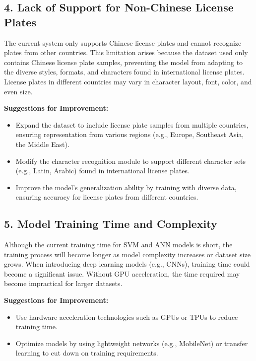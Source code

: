 \documentclass{article}
\begin{document}
	\subsection*{4. Lack of Support for Non-Chinese License Plates}
	
	The current system only supports Chinese license plates and cannot recognize plates from other countries. This limitation arises because the dataset used only contains Chinese license plate samples, preventing the model from adapting to the diverse styles, formats, and characters found in international license plates. License plates in different countries may vary in character layout, font, color, and even size.
	
	\textbf{Suggestions for Improvement:}
	\begin{itemize}
		\item Expand the dataset to include license plate samples from multiple countries, ensuring representation from various regions (e.g., Europe, Southeast Asia, the Middle East).
		\item Modify the character recognition module to support different character sets (e.g., Latin, Arabic) found in international license plates.
		\item Improve the model's generalization ability by training with diverse data, ensuring accuracy for license plates from different countries.
	\end{itemize}
	
	\subsection*{5. Model Training Time and Complexity}
	
	Although the current training time for SVM and ANN models is short, the training process will become longer as model complexity increases or dataset size grows. When introducing deep learning models (e.g., CNNs), training time could become a significant issue. Without GPU acceleration, the time required may become impractical for larger datasets.
	
	\textbf{Suggestions for Improvement:}
	\begin{itemize}
		\item Use hardware acceleration technologies such as GPUs or TPUs to reduce training time.
		\item Optimize models by using lightweight networks (e.g., MobileNet) or transfer learning to cut down on training requirements.
	\end{itemize}
	
\end{document}
